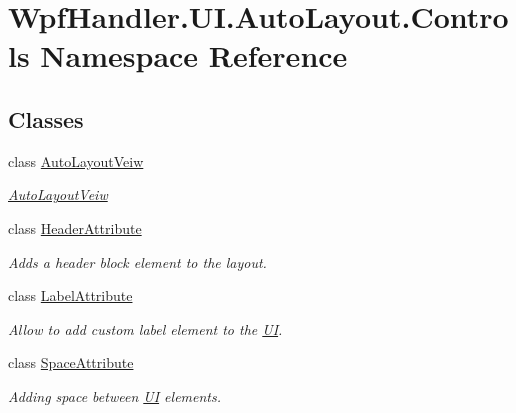 \hypertarget{namespace_wpf_handler_1_1_u_i_1_1_auto_layout_1_1_controls}{}\section{Wpf\+Handler.\+U\+I.\+Auto\+Layout.\+Controls Namespace Reference}
\label{namespace_wpf_handler_1_1_u_i_1_1_auto_layout_1_1_controls}
\subsection*{Classes}
\begin{DoxyCompactItemize}
\item 
class \mbox{\hyperlink{class_wpf_handler_1_1_u_i_1_1_auto_layout_1_1_controls_1_1_auto_layout_veiw}{Auto\+Layout\+Veiw}}
\begin{DoxyCompactList}\small\item\em \mbox{\hyperlink{class_wpf_handler_1_1_u_i_1_1_auto_layout_1_1_controls_1_1_auto_layout_veiw}{Auto\+Layout\+Veiw}} \end{DoxyCompactList}\item 
class \mbox{\hyperlink{class_wpf_handler_1_1_u_i_1_1_auto_layout_1_1_controls_1_1_header_attribute}{Header\+Attribute}}
\begin{DoxyCompactList}\small\item\em Adds a header block element to the layout. \end{DoxyCompactList}\item 
class \mbox{\hyperlink{class_wpf_handler_1_1_u_i_1_1_auto_layout_1_1_controls_1_1_label_attribute}{Label\+Attribute}}
\begin{DoxyCompactList}\small\item\em Allow to add custom label element to the \mbox{\hyperlink{namespace_wpf_handler_1_1_u_i}{UI}}. \end{DoxyCompactList}\item 
class \mbox{\hyperlink{class_wpf_handler_1_1_u_i_1_1_auto_layout_1_1_controls_1_1_space_attribute}{Space\+Attribute}}
\begin{DoxyCompactList}\small\item\em Adding space between \mbox{\hyperlink{namespace_wpf_handler_1_1_u_i}{UI}} elements. \end{DoxyCompactList}\end{DoxyCompactItemize}
